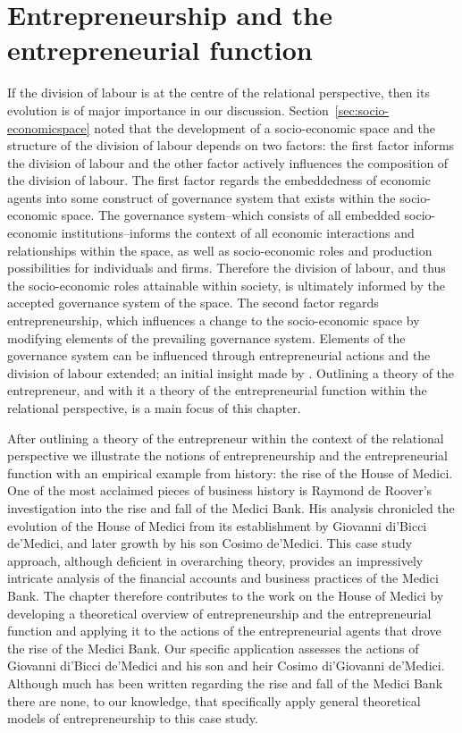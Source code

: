 \chapter{Entrepreneurship and the entrepreneurial function} 
\label{ch:entrepreneurship}

If the division of labour is at the centre of the relational perspective, then its evolution is of major importance in our discussion. Section~\ref{sec:socio-economicspace} noted that the development of a socio-economic space and the structure of the division of labour depends on two factors: the first factor informs the division of labour and the other factor actively influences the composition of the division of labour. The first factor regards the embeddedness of economic agents into some construct of governance system that exists within the socio-economic space. The governance system--which consists of all embedded socio-economic institutions--informs the context of all economic interactions and relationships within the space, as well as socio-economic roles and production possibilities for individuals and firms. Therefore the division of labour, and thus the socio-economic roles attainable within society, is ultimately informed by the accepted governance system of the space. The second factor regards entrepreneurship, which influences a change to the socio-economic space by modifying elements of the prevailing governance system. Elements of the governance system can be influenced through entrepreneurial actions and the division of labour extended; an initial insight made by \citet{Smith1776}. Outlining a theory of the entrepreneur, and with it a theory of the entrepreneurial function within the relational perspective, is a main focus of this chapter.

After outlining a theory of the entrepreneur within the context of the relational perspective we illustrate the notions of entrepreneurship and the entrepreneurial function with an empirical example from history: the rise of the House of Medici. One of the most acclaimed pieces of business history is Raymond de Roover's investigation into the rise and fall of the Medici Bank. His analysis chronicled the evolution of the House of Medici from its establishment by Giovanni di'Bicci de'Medici, and later growth by his son Cosimo de'Medici. This case study approach, although deficient in overarching theory, provides an impressively intricate analysis of the financial accounts and business practices of the Medici Bank. The chapter therefore contributes to the work on the House of Medici by developing a theoretical overview of entrepreneurship and the entrepreneurial function and applying it to the actions of the entrepreneurial agents that drove the rise of the Medici Bank. Our specific application assesses the actions of Giovanni di'Bicci de'Medici and his son and heir Cosimo di'Giovanni de'Medici. Although much has been written regarding the rise and fall of the Medici Bank there are none, to our knowledge, that specifically apply general theoretical models of entrepreneurship to this case study.

